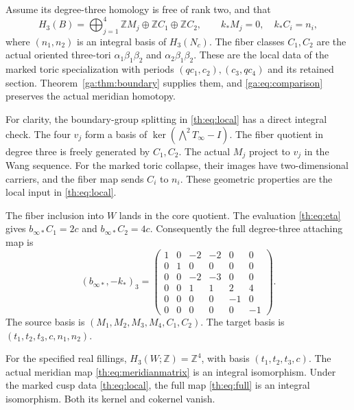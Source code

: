 Assume its degree-three homology is free of rank two, and that
\begin{equation}\label{th:eq:local}
H_3(B)=
\bigoplus_{j=1}^4\mathbb ZM_j\oplus\mathbb ZC_1\oplus\mathbb ZC_2,
\qquad
k_*M_j=0,\quad k_*C_i=n_i,
\end{equation}
where $(n_1,n_2)$ is an integral basis of $H_3(N_c)$.
The fiber classes $C_1,C_2$ are the actual oriented three-tori
$\alpha_1\beta_1\beta_2$ and $\alpha_2\beta_1\beta_2$.
These are the local data of the marked toric specialization with periods
$(qc_1,c_2),(c_3,qc_4)$ and its retained section.
Theorem~\ref{ga:thm:boundary} supplies them, and
\eqref{ga:eq:comparison} preserves the actual meridian homotopy.

For clarity, the boundary-group splitting in \eqref{th:eq:local}
has a direct integral check.
The four $v_j$ form a basis of $\ker(\bigwedge^2T_\infty-I)$.
The fiber quotient in degree three is freely generated by $C_1,C_2$.
The actual $M_j$ project to $v_j$ in the Wang sequence.
For the marked toric collapse, their images have two-dimensional carriers,
and the fiber map sends $C_i$ to $n_i$.
These geometric properties are the local input in \eqref{th:eq:local}.

The fiber inclusion into $W$ lands in the core quotient.
The evaluation \eqref{th:eq:eta} gives
$b_{\infty*}C_1=2c$ and $b_{\infty*}C_2=4c$.
Consequently the full degree-three attaching map is
\begin{equation}\label{th:eq:full}
(b_{\infty*},-k_*)_3=
\begin{pmatrix}
1&0&-2&-2&0&0\\
0&1&0&0&0&0\\
0&0&-2&-3&0&0\\
0&0&1&1&2&4\\
0&0&0&0&-1&0\\
0&0&0&0&0&-1
\end{pmatrix}.
\end{equation}
The source basis is $(M_1,M_2,M_3,M_4,C_1,C_2)$.
The target basis is $(t_1,t_2,t_3,c,n_1,n_2)$.

\begin{theorem}\label{th:thm:third}
For the specified real fillings,
$H_3(W;\mathbb Z)=\mathbb Z^4$, with basis $(t_1,t_2,t_3,c)$.
The actual meridian map \eqref{th:eq:meridianmatrix} is an integral isomorphism.
Under the marked cusp data \eqref{th:eq:local}, the full map
\eqref{th:eq:full} is an integral isomorphism.
Both its kernel and cokernel vanish.
\end{theorem}

